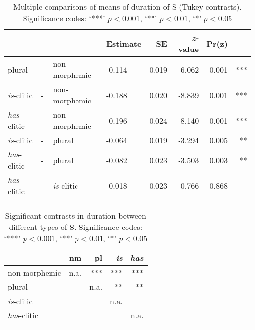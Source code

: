 \begin{table}[H]\fontsize{10}{11}
\caption{Multiple comparisons of means of duration of S (Tukey contrasts). Significance codes: `***' $p < 0.001$, `**' $p < 0.01$, `*' $p < 0.05$}
\label{tab:4.6}
\centering
\begin{tabular}{llllrrrr} 
\lsptoprule
~                   & ~ & ~                  & Estimate & SE    & \textit{z}-value & Pr(\textbar{}z\textbar{}) & ~    \\ 
\midrule
plural              & - & non-morphemic      & -0.114   & 0.019 & -6.062           & 
  0.001                  & ***  \\
\textit{is}-clitic  & - & non-morphemic      & -0.188   & 0.020 & -8.839           &  0.001                    & ***  \\
\textit{has}-clitic & - & non-morphemic      & -0.196   & 0.024 & -8.140           & 
  0.001                  & ***  \\
\textit{is}-clitic  & - & plural             & -0.064   & 0.019 & -3.294           & 0.005                     & **   \\
\textit{has}-clitic & - & plural             & -0.082   & 0.023 & -3.503           & 0.003                     & **   \\
\textit{has}-clitic & - & \textit{is}-clitic & -0.018   & 0.023 & -0.766           & 0.868                     & ~    \\
\lspbottomrule
\end{tabular}
\end{table}




\begin{table}[H]\fontsize{10}{11}
\caption{Significant contrasts in duration between different types of S. Significance codes: `***' $p < 0.001$, `**' $p < 0.01$, `*' $p < 0.05$}
\label{tab:4.7}
\centering
\begin{tabular}{lrrrr} 
\lsptoprule
~                   & nm   & pl   & \textit{is} & \textit{has}  \\ 
\midrule
non-morphemic       & n.a. & ***  & ***         & ***           \\
plural              & ~    & n.a. & **          & **            \\
\textit{is}-clitic  & ~    & ~    & n.a.        & ~             \\
\textit{has}-clitic & ~    & ~    & ~           & n.a.          \\
\lspbottomrule
\end{tabular}
\end{table}



